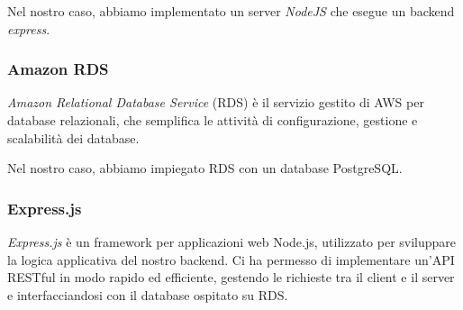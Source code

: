 Nel nostro caso, abbiamo implementato un server \textit{NodeJS} che esegue un backend \textit{express}.

\subsubsection{Amazon RDS}
\textit{Amazon Relational Database Service} (RDS) è il servizio gestito di AWS per database relazionali, che semplifica le attività di configurazione, gestione e scalabilità dei database. 

Nel nostro caso, abbiamo impiegato RDS con un database PostgreSQL.

\subsubsection{Express.js}
\textit{Express.js} è un framework per applicazioni web Node.js, utilizzato per sviluppare la logica applicativa del nostro backend. Ci ha permesso di implementare un'API RESTful in modo rapido ed efficiente, gestendo le richieste tra il client e il server e interfacciandosi con il database ospitato su RDS.
